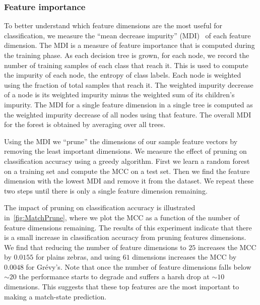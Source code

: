         \PositiveHist{}

        \PositiveROC{}

        \FloatBarrier{}
        \subsubsection{Feature importance}

        To better understand which feature dimensions are the most useful for classification, we measure the
          ``mean decrease impurity'' (MDI)~\cite{louppe_understanding_2014} of each feature dimension.
        The MDI is a measure of feature importance that is computed during the training phase.
        As each decision tree is grown, for each node, we record the number of training samples of each class
          that reach it.
        This is used to compute the impurity of each node, \ie{} the entropy of class labels.
        Each node is weighted using the fraction of total samples that reach it.
        The weighted impurity decrease of a node is its weighted impurity minus the weighted sum of its
          children's impurity.
        The MDI for a single feature dimension in a single tree is computed as the weighted impurity decrease of
          all nodes using that feature.
        The overall MDI for the forest is obtained by averaging over all trees.


        Using the MDI we ``prune'' the dimensions of our sample feature vectors by removing the least important
          dimensions.
        We measure the effect of pruning on classification accuracy using a greedy algorithm.
        First we learn a random forest on a training set and compute the MCC on a test set.
        Then we find the feature dimension with the lowest MDI and remove it from the dataset.
        We repeat these two steps until there is only a single feature dimension remaining.

        The impact of pruning on classification accuracy is illustrated in~\cref{fig:MatchPrune}, where we plot
          the MCC as a function of the number of feature dimensions remaining.
        The results of this experiment indicate that there is a small increase in classification accuracy from
          pruning features dimensions.
        We find that reducing the number of feature dimensions to $25$ increases the MCC by $0.0155$ for plains
          zebras, and using $61$ dimensions increases the MCC by $0.0048$ for Grévy's.
        Note that once the number of feature dimensions falls below ${\sim}20$ the performance starts to degrade
          and suffers a harsh drop at ${\sim}10$ dimensions.
        This suggests that these top features are the most important to making a match-state prediction.

